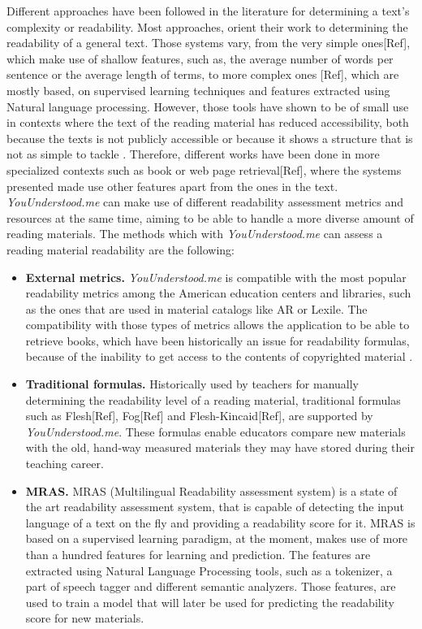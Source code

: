 \documentclass{sig-alternate-05-2015}
\begin{document}
Different approaches have been followed in the literature for determining a text's complexity or readability. Most approaches, orient their work to determining the readability of a general text. Those systems vary, from the very simple ones[Ref], which make use of shallow features, such as, the average number of words per sentence or the average length of terms, to more complex ones [Ref], which are mostly based, on supervised learning techniques and features extracted using Natural language processing. However, those tools have shown to be of small use in contexts where the text of the reading material has reduced accessibility, both because the texts is not publicly accessible or because it shows a structure that is not as simple to tackle . Therefore, different works have been done in more specialized contexts such as book\cite{denning2015readability} or web page retrieval[Ref], where the systems presented made use other features apart from the ones in the text.\\


\textit{YouUnderstood.me} can make use of different readability assessment metrics and resources at the same time, aiming to be able to handle a more diverse amount of reading materials. The methods  which with \textit{YouUnderstood.me} can assess a reading material readability are the following:

\begin{itemize}
\item \textbf{External metrics.} \textit{YouUnderstood.me} is compatible with the most popular readability metrics among the American education centers and libraries, such as the ones that are used in material catalogs like AR or Lexile. The compatibility with those types of metrics allows the application to be able to retrieve books, which have been historically an issue for readability formulas, because of the inability to get access to the contents of copyrighted material \cite{denning2015readability}.
\item \textbf{Traditional formulas.} Historically used by teachers for manually determining the readability level of a reading material, traditional formulas such as Flesh[Ref], Fog[Ref] and Flesh-Kincaid[Ref], are supported by \textit{YouUnderstood.me}. These formulas enable educators compare new materials with the old, hand-way measured materials they may have stored during their teaching career.
\item \textbf{MRAS.} MRAS\cite{imadrazo2016readability} (Multilingual Readability assessment system) is a state of the art readability assessment system, that is capable of detecting the input language of a text on the fly and providing a readability score for it. MRAS is based on a supervised learning paradigm, at the moment, makes use of more than a hundred features for learning and prediction. The features are extracted using Natural Language Processing tools, such as a tokenizer, a part of speech tagger and different semantic analyzers. Those features, are used to train a model that will later be used for predicting the readability score for new materials.


\end{itemize}
\end{document}
